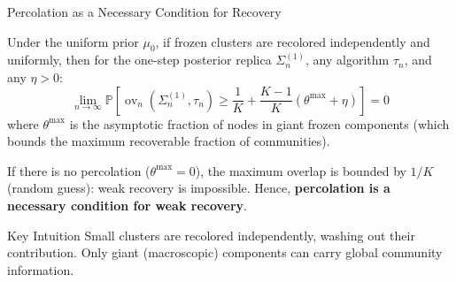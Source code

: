 \documentclass[A4,svgnames,9pt,aspectratio=169]{beamer}
\newcommand{\ov}{\operatorname{ov}}
\begin{document}
\begin{frame}{Percolation as a Necessary Condition for Recovery}
  \begin{theorem}
    Under the uniform prior $\mu_0$, if frozen clusters are recolored independently and uniformly, then for the one-step posterior replica $\Sigma_n^{(1)}$, any algorithm $\tau_n$, and any $\eta > 0$:
    \begin{equation*}
        \lim_{n\to\infty} \mathbb{P}\left[ \ov_n(\Sigma_n^{(1)}, \tau_n) \ge \frac{1}{K} + \frac{K-1}{K}(\theta^{\max} + \eta) \right] = 0
    \end{equation*}
    where $\theta^{\max}$ is the asymptotic fraction of nodes in giant frozen components (which bounds the maximum recoverable fraction of communities).
  \end{theorem}
  
  \begin{corollary}
    If there is no percolation ($\theta^{\max} = 0$), the maximum overlap is bounded by $1/K$ (random guess): weak recovery is impossible.
    Hence, \textbf{percolation is a necessary condition for weak recovery}.
  \end{corollary}

  \begin{block}{Key Intuition}
    Small clusters are recolored independently, washing out their contribution. Only giant (macroscopic) components can carry global community information.
  \end{block}
\end{frame}
\end{document}
